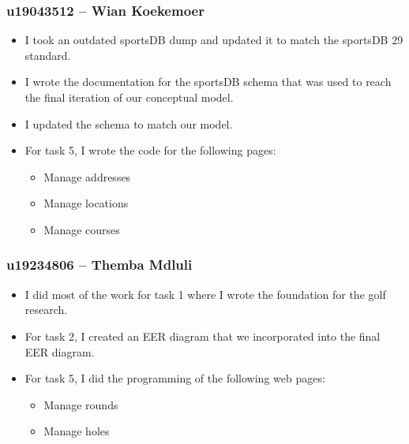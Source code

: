 \documentclass[titlepage]{article}
\begin{document}
\subsubsection*{u19043512 – Wian Koekemoer}
\vspace{1em}
\begin{itemize}
  \item I took an outdated sportsDB dump and updated it to match the sportsDB 29 standard.
  \item I wrote the documentation for the sportsDB schema that was used to reach the final iteration of our conceptual model. 
  \item I updated the schema to match our model. 
  \item For task 5, I wrote the code for the following pages:
  \begin{itemize}
    \item Manage addresses 
    \item Manage locations 
    \item Manage courses
  \end{itemize}
\end{itemize}
\vspace{1em}
\subsubsection*{u19234806 – Themba Mdluli}
\vspace{1em}
\begin{itemize}
  \item I did most of the work for task 1 where I wrote the foundation for the golf research.
  \item For task 2, I created an EER diagram that we incorporated into the final EER diagram.
  \item For task 5, I did the programming of the following web pages:
  \begin{itemize}
    \item Manage rounds
    \item Manage holes
  \end{itemize}
\end{itemize}
\vspace{1em}
\end{document}
